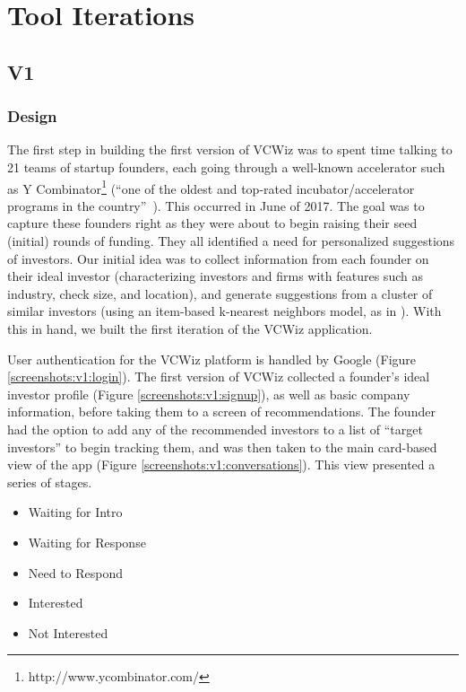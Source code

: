 \section{Tool Iterations}

\subsection{V1}

\subsubsection{Design}

The first step in building the first version of VCWiz was to spent time talking to 21 teams of startup founders, each going through a well-known accelerator such as Y Combinator\footnote{http://www.ycombinator.com/} (``one of the oldest and top-rated incubator/accelerator programs in the country''~\cite{stross2013launch}). This occurred in June of 2017. The goal was to capture these founders right as they were about to begin raising their seed (initial) rounds of funding. They all identified a need for personalized suggestions of investors. Our initial idea was to collect information from each founder on their ideal investor (characterizing investors and firms with features such as industry, check size, and location), and generate suggestions from a cluster of similar investors (using an item-based k-nearest neighbors model, as in \cite{Stone:2013:EST:2541167.2507882}). With this in hand, we built the first iteration of the VCWiz application.

User authentication for the VCWiz platform is handled by Google (Figure \ref{screenshots:v1:login}). The first version of VCWiz collected a founder's ideal investor profile (Figure \ref{screenshots:v1:signup}), as well as basic company information, before taking them to a screen of recommendations. The founder had the option to add any of the recommended investors to a list of ``target investors'' to begin tracking them, and was then taken to the main card-based view of the app (Figure \ref{screenshots:v1:conversations}). This view presented a series of stages.

\begin{itemize}
  \item Waiting for Intro
  \item Waiting for Response
  \item Need to Respond
  \item Interested
  \item Not Interested
\end{itemize}

